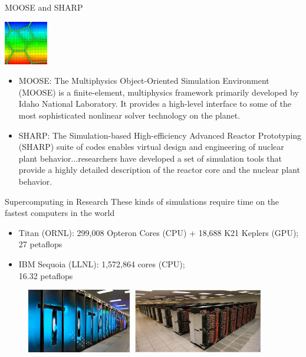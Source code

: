\documentclass[xcolor=x11names,compress, handout]{beamer}
\renewcommand{\(}{\begin{columns}}
\renewcommand{\)}{\end{columns}}
\newcommand{\<}[1]{\begin{column}{#1}}
\renewcommand{\>}{\end{column}}
\begin{document}
\begin{frame}{MOOSE and SHARP}
\begin{center}
\includegraphics[height=0.75in,clip]{moose}
\end{center}
\begin{itemize}
\item \textcolor{RawSienna}{MOOSE}: The Multiphysics Object-Oriented Simulation Environment (MOOSE) is a finite-element, multiphysics framework primarily developed by Idaho National Laboratory. It provides a high-level interface to some of the most sophisticated nonlinear solver technology on the planet.
\item \textcolor{RawSienna}{SHARP}: The Simulation-based High-efficiency Advanced Reactor Prototyping (SHARP) suite of codes enables virtual design and engineering of nuclear plant behavior...researchers have developed a set of simulation tools that provide a highly detailed description of the reactor core and the nuclear plant behavior. 
\end{itemize}
\end{frame}

\begin{frame}{Supercomputing in Research}
These kinds of simulations require time on the fastest computers in the world
\begin{itemize}
\item \textcolor{RawSienna}{Titan} (ORNL): 299,008 Opteron Cores (CPU) + 18,688 K21 Keplers (GPU); \textcolor{dgreen}{27 petaflops}
\item \textcolor{RawSienna}{IBM Sequoia} (LLNL): 1,572,864 cores (CPU); \\\textcolor{dgreen}{16.32 petaflops}
\end{itemize}
\begin{figure}
\includegraphics[height=1.1in,clip]{Titan}
\hfill
\includegraphics[height=1.1in,clip]{Sequoia}
\end{figure}
\end{frame}
\end{document}
